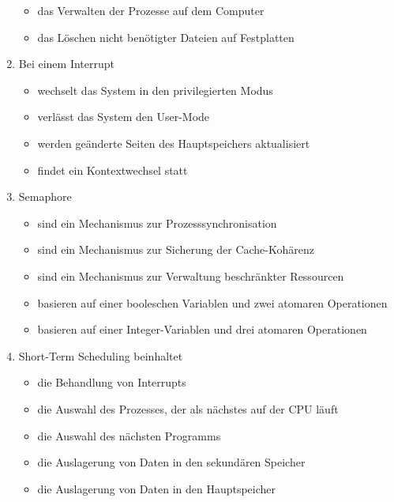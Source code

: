 \documentclass{article}
\begin{document}
\begin{enumerate}
\begin{itemize}
          \item das Verwalten der Prozesse auf dem Computer \psolution{\checkmark}
          \item das Löschen nicht benötigter Dateien auf Festplatten \psolution{\xmark}
        \end{itemize}
  \item Bei einem Interrupt
        \begin{itemize}
          \item wechselt das System in den privilegierten Modus \psolution{\checkmark}
          \item verlässt das System den User-Mode \psolution{\checkmark}
          \item werden geänderte Seiten des Hauptspeichers aktualisiert \psolution{\xmark}
          \item findet ein Kontextwechsel statt \psolution{\checkmark}
        \end{itemize}
  \item Semaphore
        \begin{itemize}
          \item sind ein Mechanismus zur Prozesssynchronisation \psolution{\checkmark}
          \item sind ein Mechanismus zur Sicherung der Cache-Kohärenz \psolution{\xmark}
          \item sind ein Mechanismus zur Verwaltung beschränkter Ressourcen \psolution{\checkmark}
          \item basieren auf einer booleschen Variablen und zwei atomaren Operationen \psolution{\xmark}
          \item basieren auf einer Integer-Variablen und drei atomaren Operationen \psolution{\checkmark}
        \end{itemize}
  \item Short-Term Scheduling beinhaltet
        \begin{itemize}
          \item die Behandlung von Interrupts \psolution{\checkmark}
          \item die Auswahl des Prozesses, der als nächstes auf der CPU läuft \psolution{\checkmark}
          \item die Auswahl des nächsten Programms \psolution{\xmark}
          \item die Auslagerung von Daten in den sekundären Speicher \psolution{\xmark}
          \item die Auslagerung von Daten in den Hauptspeicher \psolution{\xmark}

\end{itemize}
\end{enumerate}
\end{document}
